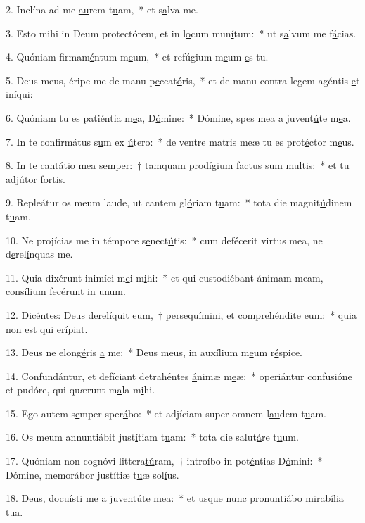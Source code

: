 2. Inclína ad me \uline{au}rem t\uline{u}am,~* et s\uline{a}lva me.\par 
3. Esto mihi in Deum protectórem, et in l\uline{o}cum mun\uline{í}tum:~* ut s\uline{a}lvum me f\uline{á}cias.\par 
4. Quóniam firmam\uline{é}ntum m\uline{e}um,~* et refúgium m\uline{e}um \uline{e}s tu.\par 
5. Deus meus, éripe me de manu p\uline{e}ccat\uline{ó}ris,~* et de manu contra legem agéntis \uline{e}t in\uline{í}qui:\par 
6. Quóniam tu es patiéntia m\uline{e}a, D\uline{ó}mine:~* Dómine, spes mea a juvent\uline{ú}te m\uline{e}a.\par 
7. In te confirmátus s\uline{u}m ex \uline{ú}tero:~* de ventre matris meæ tu es prot\uline{é}ctor m\uline{e}us.\par 
8. In te cantátio mea \uline{sem}per:~† tamquam prodígium f\uline{a}ctus sum m\uline{u}ltis:~* et tu adj\uline{ú}tor f\uline{o}rtis.\par 
9. Repleátur os meum laude, ut cantem gl\uline{ó}riam t\uline{u}am:~* tota die magnit\uline{ú}dinem t\uline{u}am.\par 
10. Ne projícias me in témpore s\uline{e}nect\uline{ú}tis:~* cum defécerit virtus mea, ne d\uline{e}rel\uline{í}nquas me.\par 
11. Quia dixérunt inimíci m\uline{e}i m\uline{i}hi:~* et qui custodiébant ánimam meam, consílium fec\uline{é}runt in \uline{u}num.\par 
12. Dicéntes: Deus derelíquit \uline{e}um,~† persequímini, et compreh\uline{é}ndite \uline{e}um:~* quia non est \uline{qui} er\uline{í}piat.\par 
13. Deus ne elong\uline{é}ris \uline{a} me:~* Deus meus, in auxílium m\uline{e}um r\uline{é}spice.\par 
14. Confundántur, et defíciant detrahéntes \uline{á}nimæ m\uline{e}æ:~* operiántur confusióne et pudóre, qui quærunt m\uline{a}la m\uline{i}hi.\par 
15. Ego autem s\uline{e}mper sper\uline{á}bo:~* et adjíciam super omnem l\uline{au}dem t\uline{u}am.\par 
16. Os meum annuntiábit just\uline{í}tiam t\uline{u}am:~* tota die salut\uline{á}re t\uline{u}um.\par 
17. Quóniam non cognóvi littera\uline{tú}ram,~† introíbo in pot\uline{é}ntias D\uline{ó}mini:~* Dómine, memorábor justítiæ t\uline{u}æ sol\uline{í}us.\par 
18. Deus, docuísti me a juvent\uline{ú}te m\uline{e}a:~* et usque nunc pronuntiábo mirab\uline{í}lia t\uline{u}a.\par 
